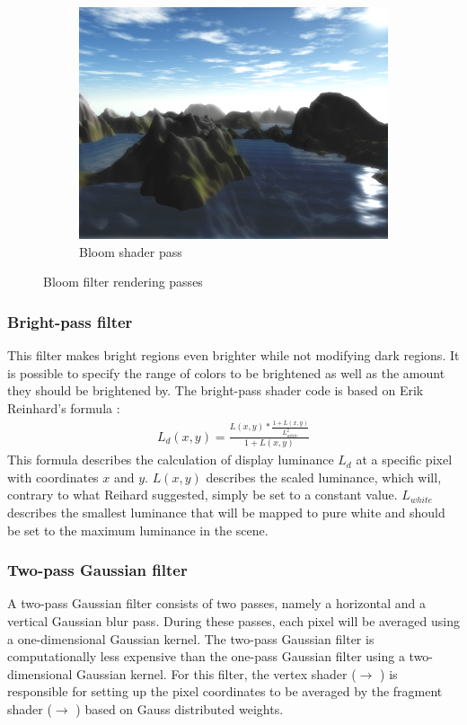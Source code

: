 \documentclass[11pt,a4paper,twoside,openright]{report}
\begin{document}
\begin{figure}[h]
\begin{subfigure}[b]{0.32\textwidth}
    \includegraphics[width=\textwidth]{shader4-bloom-screenshot.png}
    \caption{Bloom shader pass}
    \label{fig:5thpass}
  \end{subfigure}
  \caption{Bloom filter rendering passes}
\end{figure}

\subsubsection{Bright-pass filter}
This filter makes bright regions even brighter while not modifying dark regions. It is possible to specify the range of colors to be brightened as well as the amount they should be brightened by. The bright-pass shader code is based on Erik Reinhard's formula \cite{Reinhard:2002:PTR:566570.566575}:
\begin{align}
L_d(x,y) = \frac{L(x,y) * \frac{1 + L(x,y)}{L_{white}^2}}{1 + L(x,y)}
\end{align}
This formula describes the calculation of display luminance $L_d$ at a specific pixel with coordinates $x$ and $y$. $L(x,y)$ describes the scaled luminance, which will, contrary to what Reihard suggested, simply be set to a constant value. $L_{white}$ describes the smallest luminance that will be mapped to pure white and should be set to the maximum luminance in the scene.

\subsubsection{Two-pass Gaussian filter}
A two-pass Gaussian filter consists of two passes, namely a horizontal and a vertical Gaussian blur pass. During these passes, each pixel will be averaged using a one-dimensional Gaussian kernel. The two-pass Gaussian filter is computationally less expensive than the one-pass Gaussian filter using a two-dimensional Gaussian kernel. For this filter, the vertex shader ($\rightarrow$ ) is responsible for setting up the pixel coordinates to be averaged by the fragment shader ($\rightarrow$ ) based on Gauss distributed weights.
\end{document}
